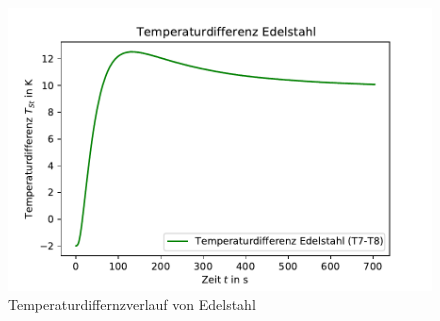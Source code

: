     \begin{figure}
        \centering
        \includegraphics{diffed.pdf}
        \caption{Temperaturdiffernzverlauf von Edelstahl}
        \label{fig:differenz2}
      \end{figure}

